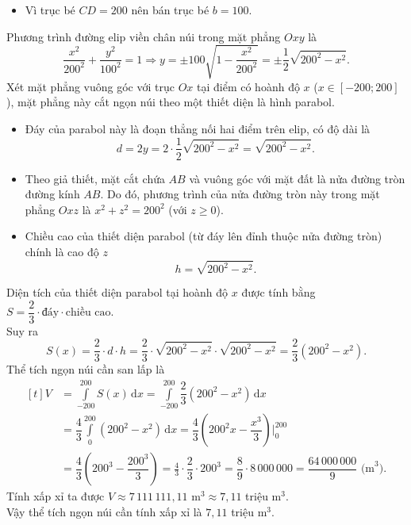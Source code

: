 \begin{ex}
{\begin{itemize}
			\item Vì trục bé $CD = 200$ nên bán trục bé $b = 100$.
		\end{itemize}
		Phương trình đường elip viền chân núi trong mặt phẳng $Oxy$ là
		\[\frac{x^2}{200^2} + \frac{y^2}{100^2} = 1 \Rightarrow y = \pm 100\sqrt{1 - \frac{x^2}{200^2}} = \pm \frac{1}{2}\sqrt{200^2 - x^2}.\]
		Xét mặt phẳng vuông góc với trục $Ox$ tại điểm có hoành độ $x$ ($x \in [-200; 200]$), mặt phẳng này cắt ngọn núi theo một thiết diện là hình parabol.
		\begin{itemize}
			\item Đáy của parabol này là đoạn thẳng nối hai điểm trên elip, có độ dài là
			\[d = 2y = 2 \cdot \frac{1}{2}\sqrt{200^2 - x^2} = \sqrt{200^2 - x^2}.\]
			\item Theo giả thiết, mặt cắt chứa $AB$ và vuông góc với mặt đất là nửa đường tròn đường kính $AB$. Do đó, phương trình của nửa đường tròn này trong mặt phẳng $Oxz$ là $x^2 + z^2 = 200^2$ (với $z \ge 0$).
			\item Chiều cao của thiết diện parabol (từ đáy lên đỉnh thuộc nửa đường tròn) chính là cao độ $z$
			\[h = \sqrt{200^2 - x^2}.\]
		\end{itemize}
		Diện tích của thiết diện parabol tại hoành độ $x$ được tính bằng $S = \dfrac{2}{3} \cdot \text{đáy} \cdot \text{chiều cao}$.\\ Suy ra 
		\[S(x) = \dfrac{2}{3} \cdot d \cdot h = \dfrac{2}{3} \cdot \sqrt{200^2 - x^2} \cdot \sqrt{200^2 - x^2} = \dfrac{2}{3}\left(200^2 - x^2\right).\]
		Thể tích ngọn núi cần san lấp là
		\allowdisplaybreaks
		\[\begin{aligned}[t]
			V &=\displaystyle\int\limits_{-200}^{200} S(x) \mathrm{\,d}x = \displaystyle\int\limits_{-200}^{200} \dfrac{2}{3}(200^2 - x^2) \mathrm{\,d}x \\
			&= \dfrac{4}{3}\displaystyle\int\limits_{0}^{200} (200^2 - x^2) \mathrm{\,d}x = \dfrac{4}{3} \left( 200^2x - \dfrac{x^3}{3} \right) \Bigg|_{0}^{200} \\
			&= \dfrac{4}{3} \left( 200^3 - \dfrac{200^3}{3} \right) = \frac{4}{3} \cdot \dfrac{2}{3} \cdot 200^3 = \dfrac{8}{9} \cdot 8\,000\,000 = \dfrac{64\,000\,000}{9} \text{ (m}^3).
		\end{aligned}\]
		Tính xấp xỉ ta được $V \approx 7\,111\,111{,}11 \text{ m}^3 \approx 7{,}11$ triệu $\text{m}^3$.\\
		Vậy thể tích ngọn núi cần tính xấp xỉ là $7{,}11$ triệu $\text{m}^3$.
	}
\end{ex}


